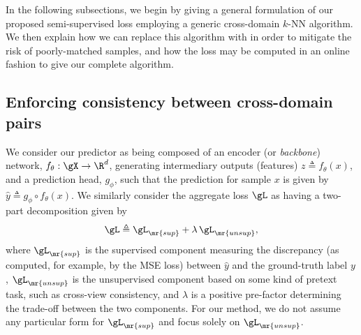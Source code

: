 In the following subsections, we begin by giving a general formulation of our proposed
semi-supervised loss employing a generic cross-domain $k$-NN algorithm. 
%
We then explain how we can replace this algorithm with \CNN{} in order to mitigate the risk of
poorly-matched samples, and how the loss may be computed in an online fashion to give our complete
algorithm.

\subsection{Enforcing consistency between cross-domain pairs}
%
We consider our predictor as being composed of an encoder (or \emph{backbone}) network, $f_\theta:
\gX \to \R^d$, generating intermediary outputs (features) $z \triangleq
f_\theta(x)$, and a prediction head, $g_\phi$, such that the prediction for sample $x$ is given by
$\hat{y} \triangleq g_\phi \circ f_\theta(x)$.
%
We similarly consider the aggregate loss $\gL$ as having a two-part decomposition given by
%
\begin{equation} \gL \triangleq \gL_{\mr{sup}} + \lambda \, \gL_{\mr{unsup}},
\end{equation}
%
where $\gL_\mr{sup}$ is the supervised component measuring the discrepancy (as computed, for
example, by the MSE loss) between $\hat{y}$ and the ground-truth label $y$, $\gL_{\mr{unsup}}$
is the unsupervised component based on some kind of pretext task, such as cross-view consistency,
and $\lambda$ is a positive pre-factor determining the trade-off between the two components.
%
For our method, we do not assume any particular form for  $\gL_{\mr{sup}}$ and focus solely on
$\gL_\mr{unsup}$.
%

